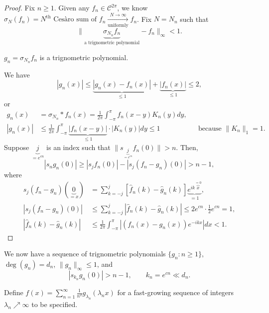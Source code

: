 \documentclass[letterpaper, reqno,11pt]{article}
\begin{document}
\begin{proof}
  Fix $n \geq 1$. Given any $f_n \in \mathcal C^{2\pi}$, we know $\sigma_N(f_n) = \text{$N^\text{th}$ Ces\`aro sum of $f_n$} \xrightarrow[\text{uniformly}]{N \to \infty} f_n$. Fix $N = N_n$ such that
  \[ \lVert \underbrace{\sigma_{N_n} f_n}_\text{a trignometric polynomial} - f_n \rVert_\infty < 1. \]

  \medskip

   $g_n = \sigma_{N_n} f_n$ is a trignometric polynomial.

  \medskip

  We have
  \[ |g_n(x)| \leq \underbrace{|g_n(x) - f_n(x)|}_{\leq 1} + \underbrace{|f_n(x)|}_{\leq 1} \leq 2, \]
  or
  \begin{align*}
    g_n(x) &= \sigma_{N_n} * f_n(x) = \frac{1}{2\pi} \int_{-\pi}^\pi f_n(x - y) K_n(y) dy, \\
    |g_n(x)| &\leq \frac{1}{2\pi} \int_{-\pi}^\pi \underbrace{|f_n(x - y)|}_{\leq 1} \cdot |K_n(y)| dy \leq 1 && \text{because $\lVert K_n \rVert_1 = 1$.}
  \end{align*}
  Suppose $\underbrace{j}_{= e^{cn}}$ is an index such that $\lVert s_{\underbrace{j}_{= e^{cn}}} f_n(0) \rVert > n$. Then,
  \[ |s_n g_n(0)| \geq |s_j f_n(0)| - |s_j (f_n - g_n)(0)| > n - 1, \]
  where
  \begin{align*}
    s_j (f_n - g_n) (\underbrace{0}_{= x}) &= \sum_{k = -j}^j \left[\widehat f_n(k) - \widehat g_n(k)\right] \underbrace{e^{ik\overbrace{x}^{= 0}}}_{= 1}, \\
    |s_j (f_n - g_n) (0)| &\leq \sum_{k = -j}^j \left|\widehat f_n(k) - \widehat g_n(k)\right| \leq 2e^{cn} \cdot \frac{1}{2} e^{cn} = 1, \\
    \left|\widehat f_n(k) - \widehat g_n(k)\right| &\leq \frac{1}{2\pi} \int_{-\pi}^\pi \left|(f_n(x) - g_n(x)) e^{-ikx}\right| dx < 1.
  \end{align*}
\end{proof}

 We now have a sequence of trignometric polynomials $\{ g_n : n \geq 1 \}$, $\deg(g_n) = d_n$, $\lVert g_n \rVert_\infty \leq 1$, and
\[ |s_{k_n} g_n(0)| > n - 1, \qquad k_n = e^{cn} \ll d_n. \]

\medskip

 Define $f(x) = \sum_{n = 1}^\infty \frac{1}{n^2} \boxed{g_{\lambda_n}(\lambda_n x)}$ for a fast-growing sequence of integers $\lambda_n \nearrow \infty$ to be specified.
\end{document}
